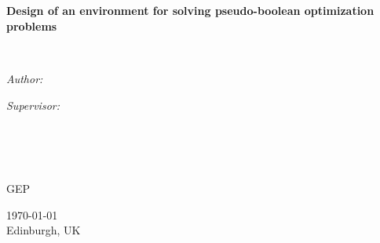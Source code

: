 \documentclass[
11pt, %
oneside, %
english, %
singlespacing, %
headsepline, %
]{MastersDoctoralThesis} %
\author{Marc \textsc{Benedí}} %
\newcommand{\projectTitle}{Design of an environment for solving pseudo-boolean optimization problems}
\newcommand{\courseName}{GEP}
\newcommand{\city}{Edinburgh, UK}
\begin{document}
\frontmatter %

\pagestyle{plain} %


\begin{titlepage}
\begin{center}

\vspace*{.06\textheight}
{\scshape\LARGE \univname\par}\vspace{1.5cm} %
\textsc{\Large \ttitle}\\[0.5cm] %

\HRule \\[0.4cm] %
{\huge \bfseries \projectTitle\par}\vspace{0.4cm} %
\HRule \\[1.5cm] %
 
\begin{minipage}[t]{0.4\textwidth}
\begin{flushleft} \large
\emph{Author:}\\
\href{https://marcb.pro}{\authorname} %
\end{flushleft}
\end{minipage}
\begin{minipage}[t]{0.4\textwidth}
\begin{flushright} \large
\emph{Supervisor:} \\
\href{https://www.cs.upc.edu/~jordicf/}{\supname} %
\end{flushright}
\end{minipage}\\[3cm]
 
\vfill

\large \textit{ }\\[0.3cm] %
\textit{ }\\[0.4cm]
\courseName\\[2cm]
\vfill

{\large \today \\ \city}\\[4cm] %
 
\vfill
\end{center}
\end{titlepage}
\end{document}
